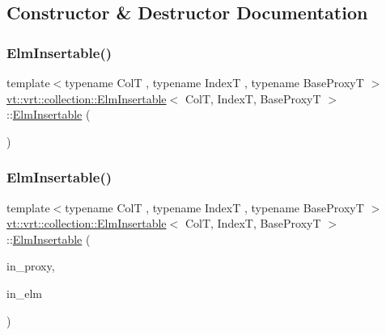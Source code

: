 \subsection{Constructor \& Destructor Documentation}
\mbox{\label{structvt_1_1vrt_1_1collection_1_1_elm_insertable_a0a5528f369218ac386c4ab521bebffdd}} 
\subsubsection{\texorpdfstring{Elm\+Insertable()}{ElmInsertable()}\hspace{0.1cm}{\footnotesize\ttfamily [1/2]}}
{\footnotesize\ttfamily template$<$typename ColT , typename IndexT , typename Base\+ProxyT $>$ \\
\hyperlink{structvt_1_1vrt_1_1collection_1_1_elm_insertable}{vt\+::vrt\+::collection\+::\+Elm\+Insertable}$<$ ColT, IndexT, Base\+ProxyT $>$\+::\hyperlink{structvt_1_1vrt_1_1collection_1_1_elm_insertable}{Elm\+Insertable} (\begin{DoxyParamCaption}{ }\end{DoxyParamCaption})\hspace{0.3cm}{\ttfamily [default]}}

\mbox{\label{structvt_1_1vrt_1_1collection_1_1_elm_insertable_adbe57f67f3d9648a9ec8434ecdde0bd6}} 
\subsubsection{\texorpdfstring{Elm\+Insertable()}{ElmInsertable()}\hspace{0.1cm}{\footnotesize\ttfamily [2/2]}}
{\footnotesize\ttfamily template$<$typename ColT , typename IndexT , typename Base\+ProxyT $>$ \\
\hyperlink{structvt_1_1vrt_1_1collection_1_1_elm_insertable}{vt\+::vrt\+::collection\+::\+Elm\+Insertable}$<$ ColT, IndexT, Base\+ProxyT $>$\+::\hyperlink{structvt_1_1vrt_1_1collection_1_1_elm_insertable}{Elm\+Insertable} (\begin{DoxyParamCaption}\item[{typename Base\+Proxy\+T\+::\+Proxy\+Type const \&}]{in\+\_\+proxy,  }\item[{typename Base\+Proxy\+T\+::\+Element\+Proxy\+Type const \&}]{in\+\_\+elm }\end{DoxyParamCaption})}



